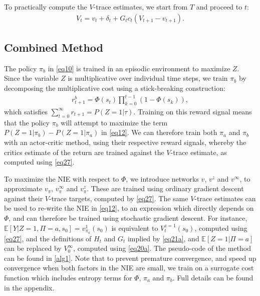 \documentclass[letterpaper]{article} %
\newcommand{\EE}{\mathbb{E}}
\newcommand{\NIE}{\textrm{NIE}\xspace}
\begin{document}
	To practically compute the $V$-trace estimates, we start from $T$ and proceed to $t$: %
	\begin{align}
		V_t = v_t + \delta_t + G_t c_t (V_{t+1} - v_{t+1}). \label{eq27}
	\end{align}
	
	
	
	
	\subsection{Combined Method} \label{s25}
	The policy $\pi_b$ in \cref{eq10} is trained in an episodic environment to maximize $Z$. Since the variable $Z$ is multiplicative over individual time steps, we train $\pi_b$ by decomposing the multiplicative cost using a stick-breaking construction: 
	\begin{align}
		r_{t+1}^b = \Phi(s_t) \prod_{k=0}^{t-1} (1-\Phi(s_k)), \label{eq41}
	\end{align}
	which satisfies $\sum_{t=0}^\infty r_{t+1} = P(Z=1|\tau)$. Training on this reward signal means that the policy $\pi_b$ will attempt to maximize the term $P(Z=1|\pi_b) - P(Z=1|\pi_a)$ in \cref{eq12}. We can therefore train both $\pi_a$ and $\pi_b$ with an actor-critic method, using their respective reward signals, whereby the critics estimate of the return are trained against the $V$-trace estimate, as computed using \cref{eq27}.
	
	
	
	To maximize the \NIE with respect to $\Phi$, we introduce networks $v$, $v^z$ and $v^\infty$, to approximate $v_\pi$, $v^\infty_\pi$ and $v^z_\pi$. These are trained using ordinary gradient descent against their $V$-trace targets, computed by \cref{eq27}. The same $V$-trace estimates can be used to re-write the \NIE in \cref{eq12}, to an expression which directly depends on $\Phi$, and can therefore be trained using stochastic gradient descent.  
	For instance, $\EE[Y|Z=1,\Pi=a,s_0] = v_{\pi_a}^1(s_0)$ is equivalent to $V^{z=1}_t(s_0)$, computed using \cref{eq27}, and the definitions of $H_t$ and $G_t$ implied by \cref{eq21a}, and $\EE\left[Z=1|\Pi= a\right]$ can be replaced by $V_0^\infty$, computed using \cref{eq20a}. The pseudo-code of the method can be found in \cref{alg1}.
	Note that to prevent premature convergence, and speed up convergence when both factors in the \NIE are small, we train on a surrogate cost function which includes entropy terms for $\Phi$, $\pi_a$ and $\pi_b$. Full details can be found in the appendix.
	
\end{document}
